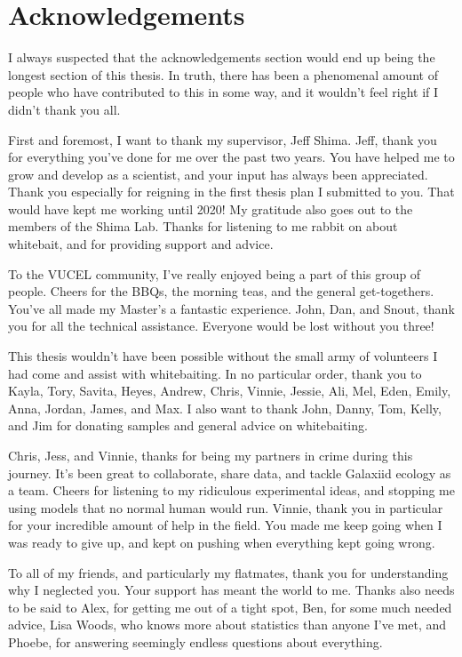 \documentclass[]{book}
\begin{document}
\section*{Acknowledgements}\label{acknowledgements}

I always suspected that the acknowledgements section would end up being
the longest section of this thesis. In truth, there has been a
phenomenal amount of people who have contributed to this in some way,
and it wouldn't feel right if I didn't thank you all.

First and foremost, I want to thank my supervisor, Jeff Shima. Jeff,
thank you for everything you've done for me over the past two years. You
have helped me to grow and develop as a scientist, and your input has
always been appreciated. Thank you especially for reigning in the first
thesis plan I submitted to you. That would have kept me working until
2020! My gratitude also goes out to the members of the Shima Lab. Thanks
for listening to me rabbit on about whitebait, and for providing support
and advice.

To the VUCEL community, I've really enjoyed being a part of this group
of people. Cheers for the BBQs, the morning teas, and the general
get-togethers. You've all made my Master's a fantastic experience. John,
Dan, and Snout, thank you for all the technical assistance. Everyone
would be lost without you three!

This thesis wouldn't have been possible without the small army of
volunteers I had come and assist with whitebaiting. In no particular
order, thank you to Kayla, Tory, Savita, Heyes, Andrew, Chris, Vinnie,
Jessie, Ali, Mel, Eden, Emily, Anna, Jordan, James, and Max. I also want
to thank John, Danny, Tom, Kelly, and Jim for donating samples and
general advice on whitebaiting.

Chris, Jess, and Vinnie, thanks for being my partners in crime during
this journey. It's been great to collaborate, share data, and tackle
Galaxiid ecology as a team. Cheers for listening to my ridiculous
experimental ideas, and stopping me using models that no normal human
would run. Vinnie, thank you in particular for your incredible amount of
help in the field. You made me keep going when I was ready to give up,
and kept on pushing when everything kept going wrong.

To all of my friends, and particularly my flatmates, thank you for
understanding why I neglected you. Your support has meant the world to
me. Thanks also needs to be said to Alex, for getting me out of a tight
spot, Ben, for some much needed advice, Lisa Woods, who knows more about
statistics than anyone I've met, and Phoebe, for answering seemingly
endless questions about everything.
\end{document}
